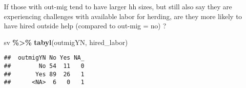 \documentclass[
]{article}
\newenvironment{Shaded}{\begin{snugshade}}{\end{snugshade}}
\newcommand{\FunctionTok}[1]{\textcolor[rgb]{0.13,0.29,0.53}{\textbf{#1}}}
\newcommand{\NormalTok}[1]{#1}
\newcommand{\SpecialCharTok}[1]{\textcolor[rgb]{0.81,0.36,0.00}{\textbf{#1}}}
\begin{document}
If those with out-mig tend to have larger hh sizes, but still also say
they are experiencing challenges with available labor for herding, are
they more likely to have hired outside help (compared to out-mig = no) ?

\begin{Shaded}
\begin{Highlighting}[]
\NormalTok{sv }\SpecialCharTok{\%\textgreater{}\%} 
  \FunctionTok{tabyl}\NormalTok{(outmigYN, hired\_labor)}
\end{Highlighting}
\end{Shaded}

\begin{verbatim}
##  outmigYN No Yes NA_
##        No 54  11   0
##       Yes 89  26   1
##      <NA>  6   0   1
\end{verbatim}
\end{document}
